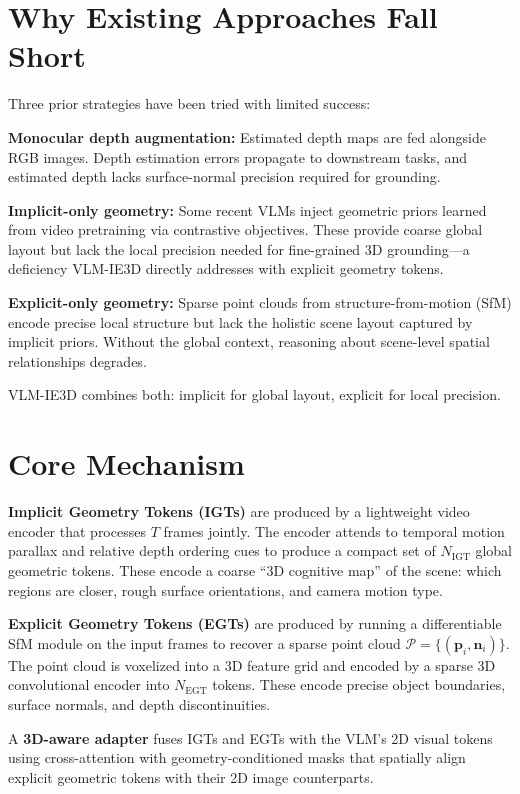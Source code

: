 \documentclass[10pt,twocolumn]{article}
\begin{document}
\section{Why Existing Approaches Fall Short}

Three prior strategies have been tried with limited success:

\textbf{Monocular depth augmentation:} Estimated depth maps are fed
alongside RGB images. Depth estimation errors propagate to downstream
tasks, and estimated depth lacks surface-normal precision required
for grounding.

\textbf{Implicit-only geometry:} Some recent VLMs inject geometric
priors learned from video pretraining via contrastive objectives.
These provide coarse global layout but lack the local precision needed
for fine-grained 3D grounding---a deficiency VLM-IE3D directly addresses
with explicit geometry tokens.

\textbf{Explicit-only geometry:} Sparse point clouds from structure-from-motion
(SfM) encode precise local structure but lack the holistic scene
layout captured by implicit priors. Without the global context,
reasoning about scene-level spatial relationships degrades.

VLM-IE3D combines both: implicit for global layout,
explicit for local precision.

\section{Core Mechanism}

\textbf{Implicit Geometry Tokens (IGTs)} are produced by a lightweight
video encoder that processes $T$ frames jointly. The encoder attends
to temporal motion parallax and relative depth ordering cues to produce
a compact set of $N_\mathrm{IGT}$ global geometric tokens. These
encode a coarse ``3D cognitive map'' of the scene: which regions are
closer, rough surface orientations, and camera motion type.

\textbf{Explicit Geometry Tokens (EGTs)} are produced by running a
differentiable SfM module on the input frames to recover a sparse
point cloud $\mathcal{P} = \{(\mathbf{p}_i, \mathbf{n}_i)\}$.
The point cloud is voxelized into a 3D feature grid and encoded by
a sparse 3D convolutional encoder into $N_\mathrm{EGT}$ tokens.
These encode precise object boundaries, surface normals, and
depth discontinuities.

A \textbf{3D-aware adapter} fuses IGTs and EGTs with the VLM's
2D visual tokens using cross-attention with geometry-conditioned masks
that spatially align explicit geometric tokens with their 2D image
counterparts.
\end{document}
